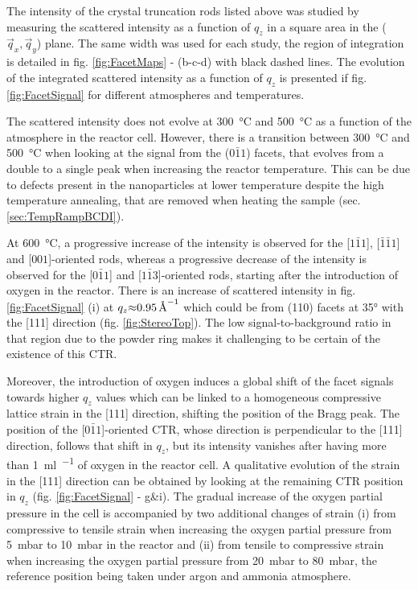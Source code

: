 The intensity of the crystal truncation rods listed above was studied by measuring the scattered intensity as a function of $q_z$ in a square area in the ($\vec{q}_x, \vec{q}_y$) plane.
The same width was used for each study, the region of integration is detailed in fig. \ref{fig:FacetMaps} - (b-c-d) with black dashed lines.
The evolution of the integrated scattered intensity as a function of $q_z$ is presented if fig. \ref{fig:FacetSignal} for different atmospheres and temperatures.

The scattered intensity does not evolve at \qty{300}{\degreeCelsius} and \qty{500}{\degreeCelsius} as a function of the atmosphere in the reactor cell.
However, there is a transition between \qty{300}{\degreeCelsius} and \qty{500}{\degreeCelsius} when looking at the signal from the ($0\bar{1}1$) facets, that evolves from a double to a single peak when increasing the reactor temperature.
This can be due to defects present in the nanoparticles at lower temperature despite the high temperature annealing, that are removed when heating the sample (sec. \ref{sec:TempRampBCDI}).

At \qty{600}{\degreeCelsius}, a progressive increase of the intensity is observed for the [$1\bar{1}1$], [$\bar{1}\bar{1}1$] and [$001$]-oriented rods, whereas a progressive decrease of the intensity is observed for the [$0\bar{1}1$] and [$1\bar{1}3$]-oriented rods, starting after the introduction of oxygen in the reactor.
There is an increase of scattered intensity in fig. \ref{fig:FacetSignal} (i) at $q_z \qty{\approx 0.95}{\per\angstrom}$ which could be from (110) facets at \ang{35} with the [111] direction (fig. \ref{fig:StereoTop}).
The low signal-to-background ratio in that region due to the powder ring makes it challenging to be certain of the existence of this CTR.

Moreover, the introduction of oxygen induces a global shift of the facet signals towards higher $q_z$ values which can be linked to a homogeneous compressive lattice strain in the [111] direction, shifting the position of the Bragg peak.
The position of the [$0\bar{1}1$]-oriented CTR, whose direction is perpendicular to the [111] direction, follows that shift in $q_z$, but its intensity vanishes after having more than \qty{1}{\ml\per\min} of oxygen in the reactor cell.
A qualitative evolution of the strain in the [111] direction can be obtained by looking at the remaining CTR position in $q_z$ (fig. \ref{fig:FacetSignal} - g\&i).
The gradual increase of the oxygen partial pressure in the cell is accompanied by two additional changes of strain (i) from compressive to tensile strain when increasing the oxygen partial pressure from \qty{5}{\milli\bar} to \qty{10}{\milli\bar} in the reactor and (ii) from tensile to compressive strain when increasing the oxygen partial pressure from \qty{20}{\milli\bar} to \qty{80}{\milli\bar}, the reference position being taken under argon and ammonia atmosphere.

